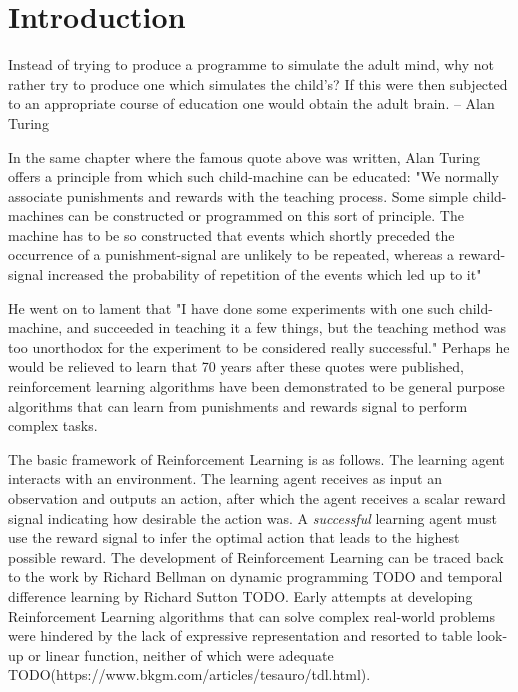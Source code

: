 \chapter{Introduction}

\begin{displayquote}
    Instead of trying to produce a programme to simulate the adult mind, why not rather try to produce one which simulates the child's? If this were then subjected to an appropriate course of education one would obtain the adult brain. -- Alan Turing
\end{displayquote}

In the same chapter where the famous quote above was written, 
Alan Turing offers a principle from which such child-machine can be educated:
"We normally associate punishments and rewards with the teaching process. 
Some simple child-machines can be constructed or programmed on this sort of principle. 
The machine has to be so constructed that events which shortly preceded the occurrence of a punishment-signal are unlikely to be repeated, whereas a reward-signal increased the probability of repetition of the events which led up to it" \cite{10.1093/mind/LIX.236.433}

He went on to lament that "I have done some experiments with one such child-machine, and succeeded in teaching it a few things, but the teaching method was too unorthodox for the experiment to be considered really successful."
Perhaps he would be relieved to learn that 70 years after these quotes were published, 
reinforcement learning algorithms 
have been demonstrated to be general purpose algorithms 
that can learn from punishments and rewards signal to perform complex tasks. 

The basic framework of Reinforcement Learning is as follows. 
The learning agent interacts with an environment.
The learning agent receives as input an observation and outputs an action, 
after which the agent receives a scalar reward signal indicating
how desirable the action was. 
A \textit{successful} learning agent must use the reward signal to 
infer the optimal action that leads to the highest possible reward.
The development of Reinforcement Learning can be traced back to 
the work by Richard Bellman on dynamic programming TODO
and temporal difference learning by Richard Sutton TODO.
Early attempts at developing Reinforcement Learning 
algorithms that can solve complex real-world problems 
were hindered by the lack of expressive representation and 
resorted to table look-up or linear function,
neither of which were adequate TODO(https://www.bkgm.com/articles/tesauro/tdl.html). 

